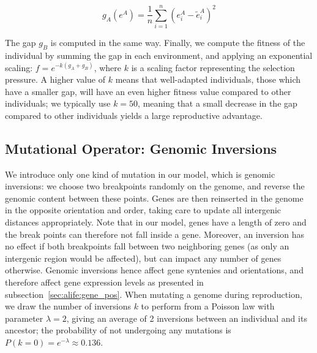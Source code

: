 \begin{equation}
  g_A(e^A) = \frac{1}{n} \sum_{i=1}^{n} (e^A_i - \tilde{e}^A_i)^2
  \label{eq:alife_gap}
\end{equation}

The gap $g_B$ is computed in the same way.
Finally, we compute the fitness of the individual by summing the gap in each environment, and applying an exponential scaling: $f = e^{-k (g_A + g_B)}$, where $k$ is a scaling factor representing the selection pressure.
A higher value of $k$ means that well-adapted individuals, those which have a smaller gap, will have an even higher fitness value compared to other individuals; we typically use $k=50$, meaning that a small decrease in the gap compared to other individuals yields a large reproductive advantage.


\subsection{Mutational Operator: Genomic Inversions}
\label{sec:inversion}

We introduce only one kind of mutation in our model, which is genomic inversions: we choose two breakpoints randomly on the genome, and reverse the genomic content between these points.
Genes are then reinserted in the genome in the opposite orientation and order, taking care to update all intergenic distances appropriately.
Note that in our model, genes have a length of zero and the break points can therefore not fall inside a gene.
Moreover, an inversion has no effect if both breakpoints fall between two neighboring genes (as only an intergenic region would be affected), but can impact any number of genes otherwise.
Genomic inversions hence affect gene syntenies and orientations, and therefore affect gene expression levels as presented in subsection~\ref{sec:alife:gene_pos}.
When mutating a genome during reproduction, we draw the number of inversions $k$ to perform from a Poisson law with parameter $\lambda = 2$, giving an average of 2 inversions between an individual and its ancestor; the probability of not undergoing any mutations is $P(k=0) = e^{-\lambda} \approx 0.136$.

